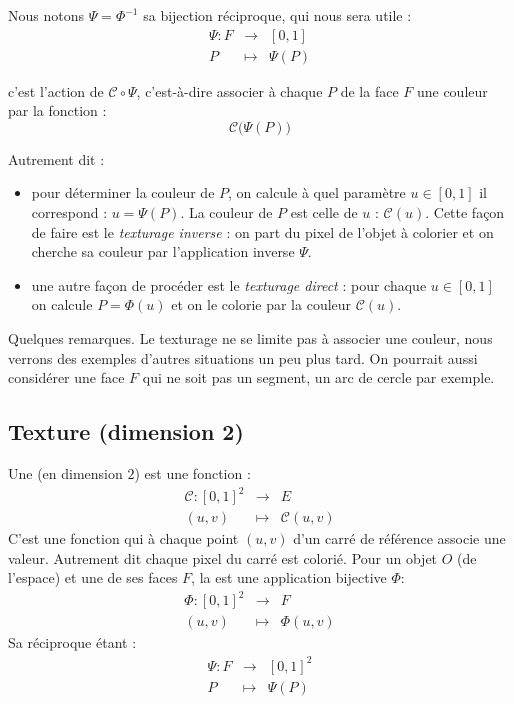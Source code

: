 \documentclass[11pt,class=report,crop=false]{standalone}
\begin{document}
Nous notons $\Psi = \Phi^{-1}$ sa bijection réciproque, qui nous sera utile : 
$$  \begin{array}{rcl}
	\Psi : F & \longrightarrow & [0,1] \\
	P & \longmapsto & \Psi(P)
\end{array}
$$

 c'est l'action de $\mathcal{C} \circ \Psi$, c'est-à-dire associer à chaque $P$ de la face $F$ une couleur par la fonction :
$$\mathcal{C}\big(\Psi(P)\big)$$

Autrement dit :
\begin{itemize}
	\item pour déterminer la couleur de $P$, on calcule à quel paramètre $u\in[0,1]$ il correspond : $u = \Psi(P)$. 
	La couleur de $P$ est celle de $u$ : $\mathcal{C}(u)$. 
	Cette façon de faire est le \emph{texturage inverse} : on part du pixel de l'objet à colorier et on cherche sa couleur par l'application inverse $\Psi$.
	
	\item une autre façon de procéder est le \emph{texturage direct} : pour chaque $u\in [0,1]$ on calcule $P = \Phi(u)$ et on le colorie par la couleur $\mathcal{C}(u)$.
\end{itemize}	

Quelques remarques. Le texturage ne se limite pas à associer une couleur, nous verrons des exemples d'autres situations un peu plus tard.
On pourrait aussi considérer une face $F$ qui ne soit pas un segment, un arc de cercle par exemple.

\subsection{Texture (dimension 2)}


Une  (en dimension $2$) est une fonction :
$$\begin{array}{rcl}
	\mathcal{C} : [0,1]^2 & \longrightarrow & E \\
	(u,v) & \longmapsto & \mathcal{C}(u,v)
\end{array}
$$
C'est une fonction qui à chaque point $(u,v)$ d'un carré de référence associe une valeur. Autrement dit chaque pixel du carré est colorié.
Pour un objet $O$ (de l'espace) et une de ses faces $F$, la  est une application bijective $\Phi$:
$$  \begin{array}{rcl}
	\Phi : [0,1]^2 & \longrightarrow & F \\
	(u,v) & \longmapsto & \Phi(u,v)
\end{array}
$$ 
Sa réciproque étant :
$$  \begin{array}{rcl}
	\Psi : F & \longrightarrow & [0,1]^2 \\
	P & \longmapsto & \Psi(P)
\end{array}
$$	
\end{document}

